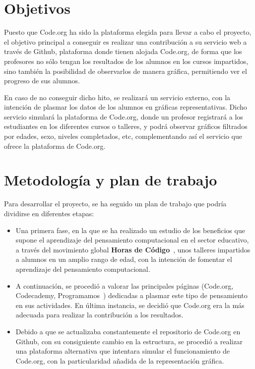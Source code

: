\section{Objetivos}
\label{1:sec:2}

Puesto que Code.org ha sido la plataforma elegida para llevar a cabo el proyecto, el objetivo principal a conseguir es realizar una contribución a su servicio web a través de Github, plataforma donde tienen alojada Code.org, de forma que los profesores no sólo tengan los resultados de los alumnos en los cursos impartidos, sino también la posibilidad de
observarlos de manera gráfica, permitiendo ver el progreso de sus alumnos.

En caso de no conseguir dicho hito, se realizará un servicio externo, con la intención de plasmar los datos de los alumnos en gráficas representativas. Dicho servicio simulará la plataforma de Code.org, donde un profesor registrará a los estudiantes en los diferentes cursos o talleres, y podrá observar gráficos filtrados por edades, sexo, niveles completados, etc,
complementando así el servicio que ofrece la plataforma de Code.org.

\section{Metodología y plan de trabajo}
\label{1:sec:3}

Para desarrollar el proyecto, se ha seguido un plan de trabajo que podría dividirse en diferentes etapas:

\begin{itemize}
  \item Una primera fase, en la que se ha realizado un estudio de los beneficios que supone el aprendizaje del pensamiento computacional en el sector educativo, a través del movimiento global \textbf{Horas de Código}~\cite{HourOfCode}, unos talleres impartidos a alumnos en un amplio rango de edad, con la intención de fomentar el aprendizaje del pensamiento computacional.
  \item A continuación, se procedió a valorar las principales páginas (Code.org, Codecademy, Programamos~\cite{Programamos}) dedicadas a plasmar este tipo de pensamiento en sus actividades. En última instancia, se decidió que Code.org era la más adecuada para realizar la contribución a los resultados.
  \item Debido a que se actualizaba constantemente el repositorio de Code.org en Github, con su consiguiente cambio en la estructura, se procedió a realizar una plataforma alternativa que intentara simular el funcionamiento de Code.org, con la particularidad añadida de la representación gráfica.
\end{itemize}

